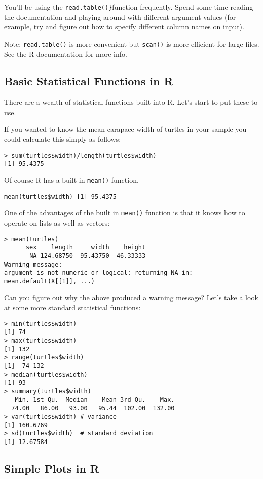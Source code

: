 You'll be using the \lstinline!read.table()}!function frequently. Spend
some time reading the documentation and playing around with different
argument values (for example, try and figure out how to specify
different column names on input).

Note: \lstinline!read.table()! is more convenient but \lstinline!scan()!
is more efficient for large files. See the R documentation for more
info.

\subsection{Basic Statistical Functions in R}

There are a wealth of statistical functions built into R. Let's start to
put these to use.

If you wanted to know the mean carapace width of turtles in your sample
you could calculate this simply as follows:

\begin{lstlisting}
> sum(turtles$width)/length(turtles$width)
[1] 95.4375
\end{lstlisting}
Of course R has a built in \lstinline!mean()! function.

\begin{lstlisting}
mean(turtles$width) [1] 95.4375
\end{lstlisting}
One of the advantages of the built in \lstinline!mean()! function is
that it knows how to operate on lists as well as vectors:

\begin{lstlisting}
> mean(turtles)
      sex    length     width    height 
       NA 124.68750  95.43750  46.33333 
Warning message:
argument is not numeric or logical: returning NA in: mean.default(X[[1]], ...) 
\end{lstlisting}
Can you figure out why the above produced a warning message? Let's take
a look at some more standard statistical functions:

\begin{lstlisting}
> min(turtles$width)
[1] 74
> max(turtles$width)
[1] 132
> range(turtles$width)
[1]  74 132
> median(turtles$width)
[1] 93
> summary(turtles$width)
   Min. 1st Qu.  Median    Mean 3rd Qu.    Max. 
  74.00   86.00   93.00   95.44  102.00  132.00 
> var(turtles$width) # variance
[1] 160.6769
> sd(turtles$width)  # standard deviation
[1] 12.67584
\end{lstlisting}
\subsection{Simple Plots in R}

